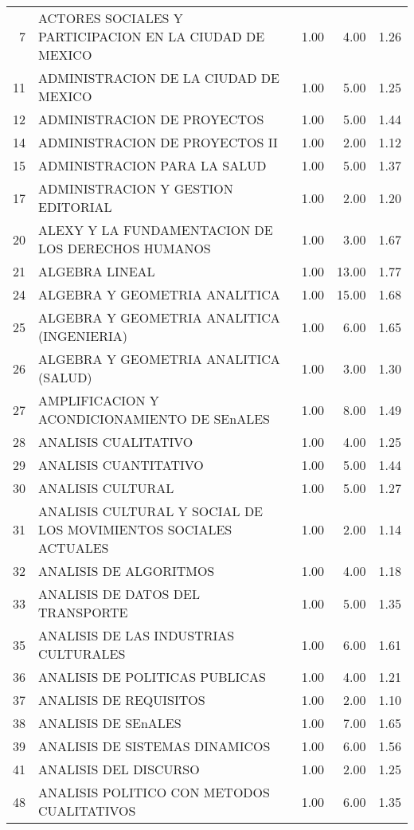 \documentclass[12pt]{article}
\begin{document}
\begin{table}[ht]
\begin{tabular}{rlrrr}
  7 & ACTORES SOCIALES Y PARTICIPACION EN LA CIUDAD DE MEXICO & 1.00 & 4.00 & 1.26 \\ 
  11 & ADMINISTRACION DE LA CIUDAD DE MEXICO & 1.00 & 5.00 & 1.25 \\ 
  12 & ADMINISTRACION DE PROYECTOS & 1.00 & 5.00 & 1.44 \\ 
  14 & ADMINISTRACION DE PROYECTOS II & 1.00 & 2.00 & 1.12 \\ 
  15 & ADMINISTRACION PARA LA SALUD & 1.00 & 5.00 & 1.37 \\ 
  17 & ADMINISTRACION Y GESTION EDITORIAL & 1.00 & 2.00 & 1.20 \\ 
  20 & ALEXY Y LA FUNDAMENTACION DE LOS DERECHOS HUMANOS & 1.00 & 3.00 & 1.67 \\ 
  21 & ALGEBRA LINEAL & 1.00 & 13.00 & 1.77 \\ 
  24 & ALGEBRA Y GEOMETRIA ANALITICA & 1.00 & 15.00 & 1.68 \\ 
  25 & ALGEBRA Y GEOMETRIA ANALITICA (INGENIERIA) & 1.00 & 6.00 & 1.65 \\ 
  26 & ALGEBRA Y GEOMETRIA ANALITICA (SALUD) & 1.00 & 3.00 & 1.30 \\ 
  27 & AMPLIFICACION Y ACONDICIONAMIENTO DE SEnALES & 1.00 & 8.00 & 1.49 \\ 
  28 & ANALISIS CUALITATIVO & 1.00 & 4.00 & 1.25 \\ 
  29 & ANALISIS CUANTITATIVO & 1.00 & 5.00 & 1.44 \\ 
  30 & ANALISIS CULTURAL & 1.00 & 5.00 & 1.27 \\ 
  31 & ANALISIS CULTURAL Y SOCIAL DE LOS MOVIMIENTOS SOCIALES ACTUALES & 1.00 & 2.00 & 1.14 \\ 
  32 & ANALISIS DE ALGORITMOS & 1.00 & 4.00 & 1.18 \\ 
  33 & ANALISIS DE DATOS DEL TRANSPORTE & 1.00 & 5.00 & 1.35 \\ 
  35 & ANALISIS DE LAS INDUSTRIAS CULTURALES & 1.00 & 6.00 & 1.61 \\ 
  36 & ANALISIS DE POLITICAS PUBLICAS & 1.00 & 4.00 & 1.21 \\ 
  37 & ANALISIS DE REQUISITOS & 1.00 & 2.00 & 1.10 \\ 
  38 & ANALISIS DE SEnALES & 1.00 & 7.00 & 1.65 \\ 
  39 & ANALISIS DE SISTEMAS DINAMICOS & 1.00 & 6.00 & 1.56 \\ 
  41 & ANALISIS DEL DISCURSO & 1.00 & 2.00 & 1.25 \\ 
  48 & ANALISIS POLITICO CON METODOS CUALITATIVOS & 1.00 & 6.00 & 1.35 \\ 

\end{tabular}
\end{table}
\end{document}
